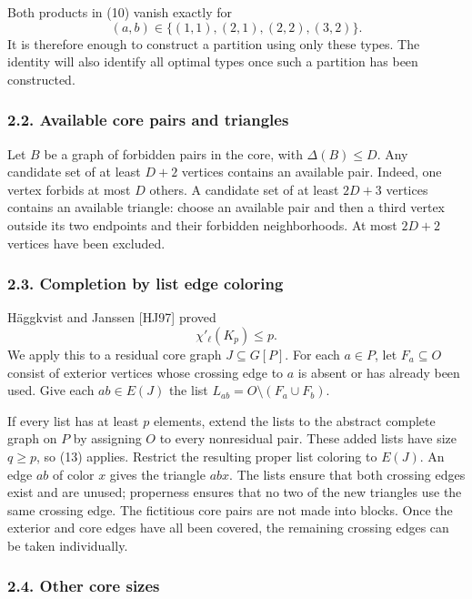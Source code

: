 \documentclass[english,11pt,a4paper]{article}
\begin{document}
Both products in (10) vanish exactly for \[
(a,b)\in\{(1,1),(2,1),(2,2),(3,2)\}. \tag{12}
\] It is therefore enough to construct a partition using only these
types. The identity will also identify all optimal types once such a
partition has been constructed.

\subsubsection{2.2. Available core pairs and
triangles}\label{available-core-pairs-and-triangles}

Let \(B\) be a graph of forbidden pairs in the core, with
\(\Delta(B)\le D\). Any candidate set of at least \(D+2\) vertices
contains an available pair. Indeed, one vertex forbids at most \(D\)
others. A candidate set of at least \(2D+3\) vertices contains an
available triangle: choose an available pair and then a third vertex
outside its two endpoints and their forbidden neighborhoods. At most
\(2D+2\) vertices have been excluded.

\subsubsection{2.3. Completion by list edge
coloring}\label{completion-by-list-edge-coloring}

Häggkvist and Janssen {[}HJ97{]} proved \[
\chi'_{\ell}(K_p)\le p. \tag{13}
\] We apply this to a residual core graph \(J\subseteq G[P]\). For each
\(a\in P\), let \(F_a\subseteq O\) consist of exterior vertices whose
crossing edge to \(a\) is absent or has already been used. Give each
\(ab\in E(J)\) the list \(L_{ab}=O\setminus(F_a\cup F_b)\).

If every list has at least \(p\) elements, extend the lists to the
abstract complete graph on \(P\) by assigning \(O\) to every nonresidual
pair. These added lists have size \(q\ge p\), so (13) applies. Restrict
the resulting proper list coloring to \(E(J)\). An edge \(ab\) of color
\(x\) gives the triangle \(abx\). The lists ensure that both crossing
edges exist and are unused; properness ensures that no two of the new
triangles use the same crossing edge. The fictitious core pairs are not
made into blocks. Once the exterior and core edges have all been
covered, the remaining crossing edges can be taken individually.

\subsubsection{2.4. Other core sizes}\label{other-core-sizes}
\end{document}
